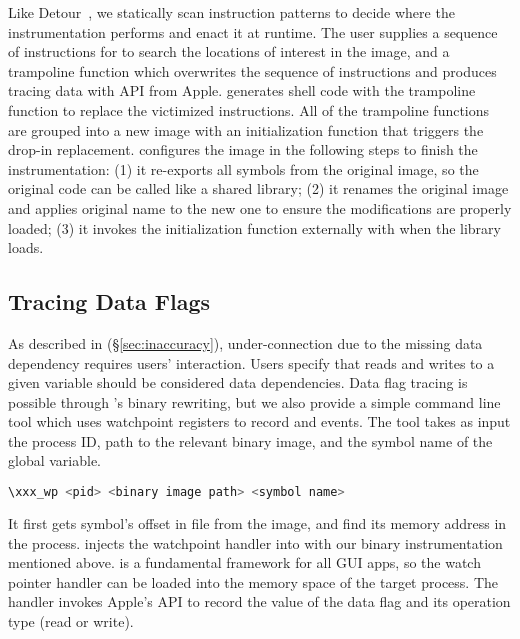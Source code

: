 Like Detour~\cite{hunt1999detours}, we statically scan instruction patterns
to decide where the instrumentation performs and enact it at runtime. The
user supplies a sequence of instructions for \xxx to search the locations of
interest in the image, and a trampoline function which overwrites the sequence
of instructions and produces tracing data with API  from
Apple. \xxx generates shell code with the trampoline function to replace the
victimized instructions. All of the trampoline functions are grouped into a new
image with an initialization function that triggers the drop-in replacement.
\xxx configures the image in the following steps to finish the instrumentation:
(1) it re-exports all symbols from the original image, so the original code can
be called like a shared library; (2) it renames the original image and applies
original name to the new one to ensure the modifications are properly loaded;
(3) it invokes the initialization function externally with 
when the library loads.

\subsection{Tracing Data Flags} \label{subsec:tcp}

As described in (\S\ref{sec:inaccuracy}), under-connection due to the missing
data dependency requires users' interaction. Users specify that reads and writes
to a given variable should be considered data dependencies. Data flag tracing
is possible through \xxx's binary rewriting, but we also provide a simple
command line tool which uses watchpoint registers to record \dataflagwrite and
\dataflagread events. The tool  takes as input the process ID,
path to the relevant binary image, and the symbol name of the global variable.

\begin{lstlisting}[language=c++,numbers=none]
\xxx_wp <pid> <binary image path> <symbol name>
\end{lstlisting}

\noindent It first gets symbol's offset in file from the image, and find
its memory address in the process. \xxx injects the watchpoint handler
into  with our binary instrumentation mentioned above.
 is a fundamental framework for all GUI apps, so the watch
pointer handler can be loaded into the memory space of the target process. The
handler invokes Apple's API  to record the value of the data
flag and its operation type (read or write).

